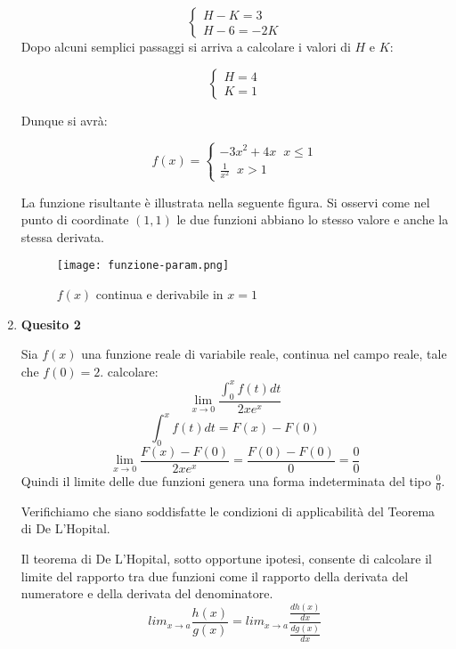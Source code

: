 \documentclass[a4paper,12pt]{article}
\begin{document}
\begin{enumerate}
\begin{equation}
\left\{
\begin{array}{l}
H-K=3\\ H-6=-2K
\end{array}
\right.
\end{equation}
Dopo alcuni semplici passaggi si arriva a calcolare i valori di $H$ e $K$:

\begin{equation}
\left\{
\begin{array}{l}
H=4\\K=1
\end{array}
\right.
\end{equation}

Dunque si avrà:

\begin{equation} f(x)=
\left\{
\begin{array}{l}
 -3x^2+4x\;\; x \le 1\\ \frac{1}{x^2}\;\; x>1
\end{array}
\right.
\end{equation}

La funzione risultante è illustrata nella seguente figura. Si osservi come nel punto di coordinate $(1,1)$ le due funzioni abbiano lo stesso valore e anche la stessa derivata. 
\begin{figure}[H]
\centering
\texttt{[image: funzione-param.png]}
\caption {$f(x)$ continua e derivabile in $x=1$}
\end{figure}

\item \textbf{Quesito 2}

Sia $f(x)$ una funzione reale di variabile reale, continua nel campo reale, tale che $f(0) = 2$. calcolare:
\begin{equation}\lim_{x\rightarrow 0}\frac{\int_{0}^x f(t)dt}{2xe^x}\end{equation}
\begin{equation}\int_{0}^x f(t)dt=F(x)-F(0)\end{equation}
\begin{equation}\lim_{x\rightarrow 0}\frac{F(x)-F(0)}{2xe^x}=\frac{F(0)-F(0)}{0}=\frac{0}{0}\end{equation}
Quindi il limite delle due funzioni genera una forma indeterminata del tipo $\frac{0}{0}$.

Verifichiamo che siano soddisfatte le condizioni di applicabilità del Teorema di De L'Hopital.

Il teorema di De L'Hopital, sotto opportune ipotesi, consente di calcolare il limite del rapporto tra due funzioni come il rapporto della derivata del numeratore e della derivata del denominatore.
\begin{equation}lim_{x \rightarrow a} \frac{h(x)}{g(x)}=lim_{x \rightarrow a} \frac{ \frac{dh(x)}{dx}}{\frac{dg(x)}{dx}}\end{equation}


\end{enumerate}
\end{document}
